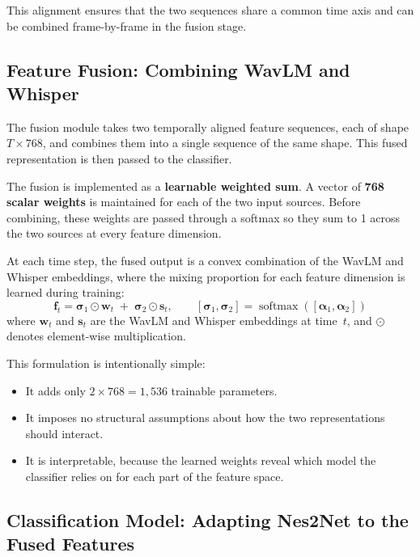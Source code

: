 \documentclass[11pt,a4paper]{article}
\begin{document}
This alignment ensures that the two sequences share a common time axis and can be
combined frame-by-frame in the fusion stage.

\subsection{Feature Fusion: Combining WavLM and Whisper}

The fusion module takes two temporally aligned feature sequences, each of shape
$T\times768$, and combines them into a single sequence of the same shape. This
fused representation is then passed to the classifier.

The fusion is implemented as a \textbf{learnable weighted sum}. A vector of
\textbf{768 scalar weights} is maintained for each of the two input sources.
Before combining, these weights are passed through a softmax so they sum to 1
across the two sources at every feature dimension.

At each time step, the fused output is a convex combination of the WavLM and
Whisper embeddings, where the mixing proportion for each feature dimension is
learned during training:
\begin{equation}
  \mathbf{f}_t = \boldsymbol{\sigma}_1 \odot \mathbf{w}_t \;+\;
                 \boldsymbol{\sigma}_2 \odot \mathbf{s}_t,
  \qquad
  [\boldsymbol{\sigma}_1, \boldsymbol{\sigma}_2]
  = \operatorname{softmax}([\boldsymbol{\alpha}_1, \boldsymbol{\alpha}_2])
  \label{eq:fusion}
\end{equation}
where $\mathbf{w}_t$ and $\mathbf{s}_t$ are the WavLM and Whisper embeddings at
time~$t$, and $\odot$ denotes element-wise multiplication.

This formulation is intentionally simple:
\begin{itemize}[noitemsep]
  \item It adds only $2\times768 = 1{,}536$ trainable parameters.
  \item It imposes no structural assumptions about how the two representations
        should interact.
  \item It is interpretable, because the learned weights reveal which model the
        classifier relies on for each part of the feature space.
\end{itemize}

\subsection{Classification Model: Adapting Nes2Net to the Fused Features}
\end{document}
